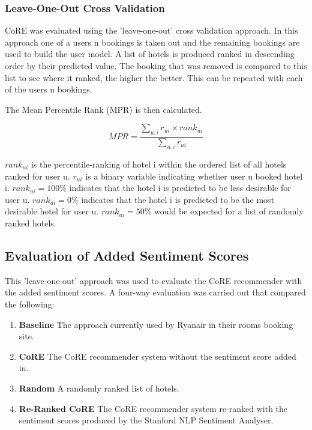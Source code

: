 \subsubsection*{Leave-One-Out Cross Validation}

CoRE was evaluated using the 'leave-one-out' cross validation approach. In this approach one of a users n bookings is taken out and the remaining bookings are used to build the user model. A list of hotels is produced ranked in descending order by their predicted value. The booking that was removed is compared to this list to see where it ranked, the higher the better. This can be repeated with each of the users n bookings.

The Mean Percentile Rank (MPR) is then calculated.

\begin{equation}
    MPR = \frac{ \sum_{u,i} r_{ui} \times rank_{ui} } {\sum_{u,i} r_{ui}}
\end{equation}

$rank_{ui}$ is the percentile-ranking of hotel i within the ordered list of all hotels ranked for user u. $r_{ui}$ is a binary variable indicating whether user u booked hotel i. $rank_{ui} = 100\%$ indicates that the hotel i is predicted to be less desirable for user u. $rank_{ui} = 0\%$ indicates that the hotel i is predicted to be the most desirable hotel for user u. $rank_{ui} = 50\%$ would be expected for a list of randomly ranked hotels.

\subsection*{Evaluation of Added Sentiment Scores}

This 'leave-one-out' approach was used to evaluate the CoRE recommender with the added sentiment scores. A four-way evaluation was carried out that compared the following:
\begin{enumerate}
    \item \textbf{Baseline} \newline
    The approach currently used by Ryanair in their rooms booking site.
    \item \textbf{CoRE} \newline
    The CoRE recommender system without the sentiment score added in.
    \item \textbf{Random} \newline
    A randomly ranked list of hotels.
    \item \textbf{Re-Ranked CoRE} \newline
    The CoRE recommender system re-ranked with the sentiment scores produced by the Stanford NLP Sentiment Analyser.
\end{enumerate}

